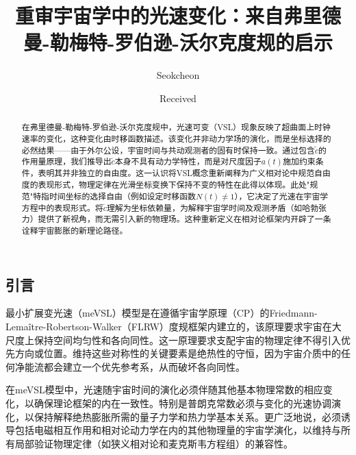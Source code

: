 \documentclass[jkps,preprint,fleqn]{revtex4}
\newcommand{\tc}{\tilde{c}}
\begin{document}
\begin{CJK*}{UTF8}{gbsn}
\setcounter{page}{0}

\title[]{重审宇宙学中的光速变化：来自弗里德曼-勒梅特-罗伯逊-沃尔克度规的启示}
\author{Seokcheon }

\date[]{Received }

\begin{abstract}
在弗里德曼-勒梅特-罗伯逊-沃尔克度规中，光速可变（VSL）现象反映了超曲面上时钟速率的变化，这种变化由时移函数描述。该变化并非动力学场的演化，而是坐标选择的必然结果——由于外尔公设，宇宙时间与共动观测者的固有时保持一致。通过包含$\tc$的作用量原理，我们推导出$\tc$本身不具有动力学特性，而是对尺度因子$a(t)$施加约束条件，表明其并非独立的自由度。这一认识将VSL概念重新阐释为广义相对论中规范自由度的表现形式，物理定律在光滑坐标变换下保持不变的特性在此得以体现。此处"规范"特指时间坐标的选择自由（例如设定时移函数$N(t) \neq 1$），它决定了光速在宇宙学方程中的表现形式。将$\tc$理解为坐标依赖量，为解释宇宙学时间及观测矛盾（如哈勃张力）提供了新视角，而无需引入新的物理场。这种重新定义在相对论框架内开辟了一条诠释宇宙膨胀的新理论路径。
\end{abstract}

\maketitle

\tableofcontents
\section{引言}
\label{sec:intro}

最小扩展变光速（meVSL）模型是在遵循宇宙学原理（CP）的Friedmann-Lemaître-Robertson-Walker（FLRW）度规框架内建立的，该原理要求宇宙在大尺度上保持空间均匀性和各向同性\cite{Lee:2020zts,Lee:2023bjz,Lee:2024mal}。这一原理要求支配宇宙的物理定律不得引入优先方向或位置。维持这些对称性的关键要素是绝热性的守恒，因为宇宙介质中的任何净能流都会建立一个优先参考系，从而破坏各向同性\cite{Lee:2022heb}。

在meVSL模型中，光速随宇宙时间的演化必须伴随其他基本物理常数的相应变化，以确保理论框架的内在一致性。特别是普朗克常数必须与变化的光速协调演化，以保持解释绝热膨胀所需的量子力学和热力学基本关系\cite{Lee:2022heb}。更广泛地说，必须诱导包括电磁相互作用和相对论动力学在内的其他物理量的宇宙学演化，以维持与所有局部验证物理定律（如狭义相对论和麦克斯韦方程组）的兼容性\cite{Lee:2020zts,Lee:2023bjz,Lee:2024mal,Lee:2022heb}。


\end{CJK*}
\end{document}
